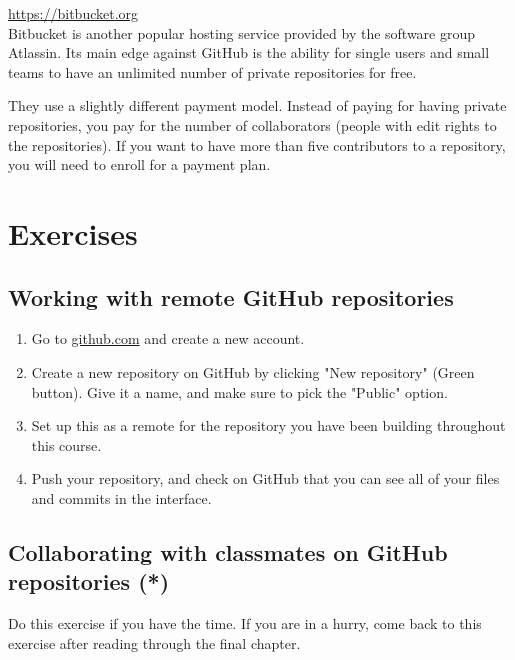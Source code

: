 \documentclass[../main/git_course_main.tex]{subfiles}
\begin{document}
\url{https://bitbucket.org} \\

Bitbucket is another popular hosting service provided by the software group Atlassin.
Its main edge against GitHub is the ability for single users and small teams to have
an unlimited number of private repositories for free.

They use a slightly different payment model. Instead of paying for having private repositories, you pay for the number of collaborators (people with edit rights to the repositories). If you want to have more than five contributors to a repository, you will need to enroll for a payment plan.

\newpage
\section{Exercises}

\subsection{Working with remote GitHub repositories}

\begin{enumerate}

\item Go to \url{github.com} and create a new account.
\item Create a new repository on GitHub by clicking "New repository" (Green button). Give it a name, and make sure to pick the "Public" option.
\item Set up this as a remote for the repository you have been building throughout this course.
\item Push your repository, and check on GitHub that you can see all of your files and commits in the interface.
\end{enumerate}

\subsection{Collaborating with classmates on GitHub repositories (*)}

Do this exercise if you have the time. If you are in a hurry, come back to this exercise after reading through the final chapter.
\end{document}
